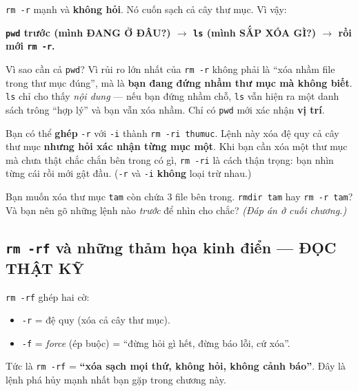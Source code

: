 \documentclass[12pt,a4paper]{article}
\newcommand{\cmd}[1]{\texttt{#1}}
\begin{document}
\begin{dangerbox}[title={Quy tắc vàng nâng cấp cho \texttt{rm -r}}]
\cmd{rm -r} mạnh và \textbf{không hỏi}. Nó cuốn sạch cả cây thư mục. Vì vậy:

\vspace{0.4em}
\centering\textbf{\cmd{pwd} trước (mình ĐANG Ở ĐÂU?) $\rightarrow$ \cmd{ls} (mình SẮP XÓA GÌ?) $\rightarrow$ rồi mới \cmd{rm -r}.}
\vspace{0.4em}

\raggedright
Vì sao cần cả \cmd{pwd}? Vì rủi ro lớn nhất của \cmd{rm -r} không phải là ``xóa nhầm file trong thư mục đúng'', mà là \textbf{bạn đang đứng nhầm thư mục mà không biết}. \cmd{ls} chỉ cho thấy \textit{nội dung} --- nếu bạn đứng nhầm chỗ, \cmd{ls} vẫn hiện ra một danh sách trông ``hợp lý'' và bạn vẫn xóa nhầm. Chỉ có \cmd{pwd} mới xác nhận \textbf{vị trí}.
\end{dangerbox}

\begin{notebox}[title={Mẹo an toàn cho người mới --- \texttt{rm -ri}}]
Bạn có thể \textbf{ghép} \cmd{-r} với \cmd{-i} thành \cmd{rm -ri thumuc}. Lệnh này xóa đệ quy cả cây thư mục \textbf{nhưng hỏi xác nhận từng mục một}. Khi bạn cần xóa một thư mục mà chưa thật chắc chắn bên trong có gì, \cmd{rm -ri} là cách thận trọng: bạn nhìn từng cái rồi mới gật đầu. (\cmd{-r} và \cmd{-i} \textbf{không} loại trừ nhau.)
\end{notebox}

\begin{checkbox}[title={Tự kiểm tra 5}]
Bạn muốn xóa thư mục \cmd{tam} còn chứa 3 file bên trong. \cmd{rmdir tam} hay \cmd{rm -r tam}? Và bạn nên gõ những lệnh nào \textit{trước} để nhìn cho chắc? \textit{(Đáp án ở cuối chương.)}
\end{checkbox}

\subsection{\texttt{rm -rf} và những thảm họa kinh điển --- ĐỌC THẬT KỸ}

\cmd{rm -rf} ghép hai cờ:
\begin{itemize}[leftmargin=1.4em]
\item \cmd{-r} = đệ quy (xóa cả cây thư mục).
\item \cmd{-f} = \textit{force} (ép buộc) = ``đừng hỏi gì hết, đừng báo lỗi, cứ xóa''.
\end{itemize}

Tức là \cmd{rm -rf} = \textbf{``xóa sạch mọi thứ, không hỏi, không cảnh báo''}. Đây là lệnh phá hủy mạnh nhất bạn gặp trong chương này.
\end{document}
